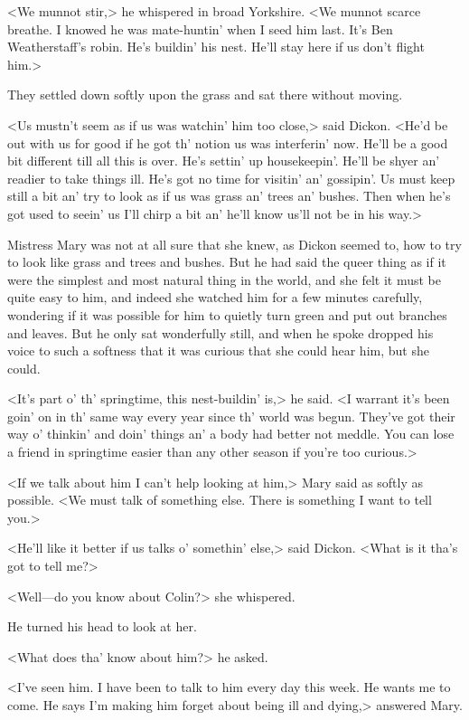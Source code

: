 <We munnot stir,> he whispered in broad Yorkshire. <We munnot scarce breathe. I knowed he was mate-huntin' when I seed him last. It's Ben Weatherstaff's robin. He's buildin' his nest. He'll stay here if us don't flight him.>

They settled down softly upon the grass and sat there without moving.

<Us mustn't seem as if us was watchin' him too close,> said Dickon. <He'd be out with us for good if he got th' notion us was interferin' now. He'll be a good bit different till all this is over. He's settin' up housekeepin'. He'll be shyer an' readier to take things ill. He's got no time for visitin' an' gossipin'. Us must keep still a bit an' try to look as if us was grass an' trees an' bushes. Then when he's got used to seein' us I'll chirp a bit an' he'll know us'll not be in his way.>

Mistress Mary was not at all sure that she knew, as Dickon seemed to, how to try to look like grass and trees and bushes. But he had said the queer thing as if it were the simplest and most natural thing in the world, and she felt it must be quite easy to him, and indeed she watched him for a few minutes carefully, wondering if it was possible for him to quietly turn green and put out branches and leaves. But he only sat wonderfully still, and when he spoke dropped his voice to such a softness that it was curious that she could hear him, but she could.

<It's part o' th' springtime, this nest-buildin' is,> he said. <I warrant it's been goin' on in th' same way every year since th' world was begun. They've got their way o' thinkin' and doin' things an' a body had better not meddle. You can lose a friend in springtime easier than any other season if you're too curious.>

<If we talk about him I can't help looking at him,> Mary said as softly as possible. <We must talk of something else. There is something I want to tell you.>

<He'll like it better if us talks o' somethin' else,> said Dickon. <What is it tha's got to tell me?>

<Well—do you know about Colin?> she whispered.

He turned his head to look at her.

<What does tha' know about him?> he asked.

<I've seen him. I have been to talk to him every day this week. He wants me to come. He says I'm making him forget about being ill and dying,> answered Mary.

